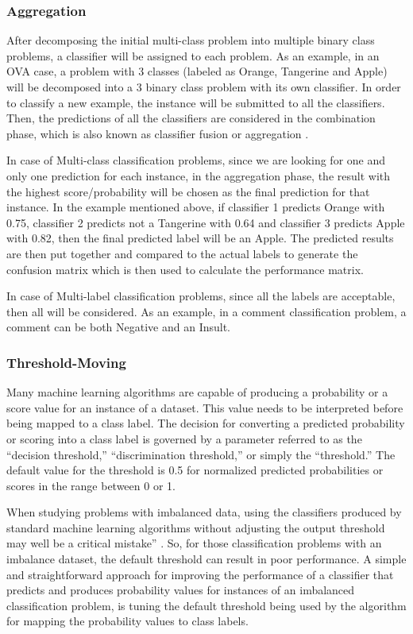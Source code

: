 \subsubsection{Aggregation}
After decomposing the initial multi-class problem into multiple binary class problems, a classifier 
will be assigned to each problem. As an example, in an OVA case, a problem with 3 classes 
(labeled as Orange, Tangerine and Apple) will be decomposed into a 3 binary class problem with its 
own classifier.  In order to classify a new example, the instance will be submitted to all the 
classifiers. Then, the predictions of all the classifiers are considered in the combination phase, 
which is also known as classifier fusion or aggregation \cite{wozniak2014survey}.

In case of Multi-class classification problems, since we are looking for one and only one prediction 
for each instance, in the aggregation phase, the result with the highest score/probability will 
be chosen as the final prediction for that instance. In the example mentioned above,  if 
classifier 1 predicts Orange with 0.75, classifier 2 predicts not a Tangerine with 0.64 and 
classifier 3 predicts Apple with 0.82, then the final predicted label will be an Apple. The 
predicted results are then put together and compared to the actual labels to generate the 
confusion matrix which is then used to calculate the performance matrix.

In case of Multi-label classification problems, since all the labels are acceptable, then all 
will be considered. As an example, in a comment classification problem, a comment can be both 
Negative and an Insult. 


\subsubsection{Threshold-Moving}
Many machine learning algorithms are capable of producing a probability or a score value for 
an instance of a dataset. This value needs to be interpreted before being mapped to a class 
label. The decision for converting a predicted probability or scoring into a class label is 
governed by a parameter referred to as the “decision threshold,” “discrimination threshold,” 
or simply the “threshold.” The default value for the threshold is 0.5 for normalized predicted 
probabilities or scores in the range between 0 or 1.

When studying problems with imbalanced data, using the classifiers produced by standard 
machine learning algorithms without adjusting the output threshold may well be a critical 
mistake” \cite{provost_machine_2000}. So, for those classification problems with an 
imbalance dataset, the default threshold can result in poor performance. A simple and 
straightforward approach for improving the performance of a classifier that predicts and 
produces probability values for instances of an imbalanced classification problem, is 
tuning the default threshold being used by the algorithm for mapping the probability 
values to class labels.


